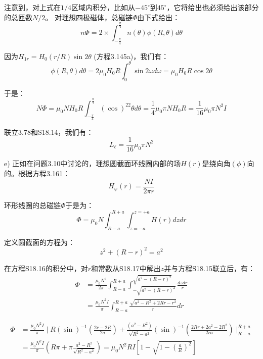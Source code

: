 注意到，对上式在$1/4$区域内积分，比如从$-45^\circ$到$45^\circ$，它将给出也必须给出该部分的总匝数$N/2$。
对理想四极磁体，总磁链$\Phi$由下式给出：
\begin{equation}%
n\Phi=2\times\int_{-\frac{\pi}{4}}^{\frac{\pi}{4}}n(\theta)\phi(R,\theta)d\theta
\end{equation}

因为$H_{1r} = H_0(r/R) \sin 2\theta$ (方程3.145a)，我们有：
 \begin{equation}%
\phi(R,\theta)d\theta=2\mu_0H_0R\int_{0}^{\theta}\sin 2\omega d\omega=\mu_0H_0R\cos 2\theta
\end{equation}

于是：
 \begin{equation}%
N\Phi=\mu_0NH_0R\int_{-\frac{\pi}{4}}^{\frac{\pi}{4}}(\cos)^22\theta d\theta
=\frac{1}{4}\mu_0\pi NH_0R=\frac{1}{16}\mu_0\pi N^2I
\end{equation}

联立3.78和S18.14，我们有：
 \begin{equation}%
L_\ell=\frac{1}{16}\mu_0\pi N^2
\end{equation}

e) 正如在问题3.10中讨论的，理想圆截面环线圈内部的场$H(r)$是绕向角$(\phi)$向的。根据方程3.161：
 \begin{equation}%
H_\varphi(r)=\frac{NI}{2\pi r}
\end{equation}

环形线圈的总磁链$\Phi$于是为：
\begin{equation}%
\Phi=\mu_0N\int_{R-a}^{R+a}\int_{z=-a}^{z=+a}H(r)dzdr
\end{equation}

定义圆截面的方程为：
 \begin{equation}%
z^2+(R-r)^2=a^2
\end{equation}

在方程S18.16的积分中，对$r$和常数从S18.17中解出$z$并与方程S18.15联立后，有：
\begin{equation}%
\begin{split}
\Phi&=\frac{\mu_0N^2}{2\pi}\int_{R-a}^{R+a}\int_{-\sqrt{a^2-(R-r)^2}}^{\sqrt{a^2-(R-r)^2}}\frac{dzdr}{r}\\
&=\frac{\mu_0N^2I}{\pi}\int_{R-a}^{R+a}\frac{\sqrt{a^2-R^2+2Rr-r^2}}{r}dr
\end{split}
\end{equation}

\begin{equation}%
\begin{split}
\Phi&=\frac{\mu_0N^2I}{\pi}\mid R(\sin)^{-1}(\frac{2r-2R}{2a})+\frac{(a^2-R^2)}{\sqrt{R^2-a^2}}(\sin)^{-1}(\frac{2Rr+2a^2-2R^2}{2ra})\mid_{R-a}^{R+a} \\
&=\frac{\mu_0N^2I}{\pi}(R\pi+\pi\frac{a^2-R^2}{\sqrt{R^2-a^2}})=\mu_0N^2RI[1-\sqrt{1-(\frac{a}{R})^2}]
\end{split}
\end{equation}

